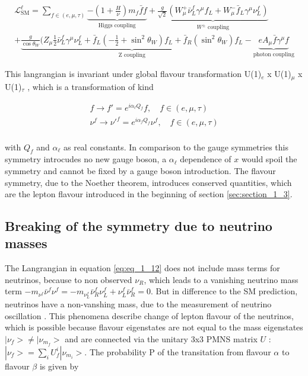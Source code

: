 \begin{multline}
	\label{eq:eq_1_12}
	\mathcal{L}^{\ell}_{\text{SM}} = \sum_{f \in (e, \mu, \tau)} \underbrace{-(1+\frac{H}{\nu}) m_{f} \bar{f}f}_\text{Higgs coupling} + \underbrace{\frac{g}{\sqrt{2}} (W^{+}_{\mu} \bar{\nu}^{f}_{L} \gamma^{\mu} f_{L} + W^{-}_{\mu} \bar{f}_{L} \gamma^{\mu} \nu^{f}_{L})}_{W^{\pm} \text{ coupling}} \\
	+ \underbrace{\frac{g}{\cos{\theta_{W}}}(Z_{\mu} \frac{1}{2} \bar{\nu}^{f}_{L} \gamma^{\mu}\nu^{f}_{L} + \bar{f}_{L}(-\frac{1}{2} + \sin^2{\theta_{W}})f_{L} + \bar{f}_{R}(\sin^2{\theta_{W}})f_{L}}_{\text{Z coupling}} - \underbrace{eA_{\mu}\bar{f}\gamma^{\mu}f}_{\text{photon coupling}}
\end{multline}

This langrangian is invariant under global flavour transformation U(1)$_{e}$ x U(1)$_{\mu}$ x U(1)$_{\tau}$ \cite{LFV1, LFV2}, which is a transformation of kind 

\begin{equation}
	\label{eq:eq_1_13}
	\begin{split}
		f \rightarrow f' = e^{i\alpha_{\ell}Q_{f}}f, \quad f \in (e, \mu, \tau) \\
		\nu^{f} \rightarrow \nu'^{f} = e^{i\alpha_{f}Q_{f}}\nu^{f}, \quad f \in (e, \mu, \tau) \\
	\end{split}
\end{equation}

with $Q_{f}$ and $\alpha_{\ell}$ as real constants. In comparison to the gauge symmetries this symmetry introcudes no new gauge boson, a $\alpha_{\ell}$ dependence of $x$ would spoil the symmetry and cannot be fixed by a gauge boson introduction. The flavour symmetry, due to the Noether theorem, introduces conserved quantities, which are the lepton flavour introduced in the beginning of section \ref{sec:section_1_3}.


\subsection{Breaking of the symmetry due to neutrino masses}
\label{sec:section_1_3_2}

The Langrangian in equation \ref{eq:eq_1_12} does not include mass terms for neutrinos, because to non observed $\nu_R$, which leads to a vanishing neutrino mass term $-m_{\nu^{f}}\bar{\nu}^{f}\nu^{f} = -m_{\nu^{f}_{L}}\bar{\nu}^{f}_{R}\nu^{f}_{L} + {\nu}^{f}_{L}\bar{\nu}^{f}_{R} = 0$. But in difference to the \acs{SM} prediction, neutrinos have a non-vanshing mass, due to the measurement of neutrino oscillation \cite{NEUTRINOOSC}. This phenomena describe change of lepton flavour of the neutrinos, which is possible because flavour eigenstates are not equal to the mass eigenstates $|\nu_{f}> \neq |\nu_{m_{f}}>$ and are connected via the unitary 3x3 PMNS matrix $U$ \cite{PMNS}: $|\nu_{f}> =  \sum_{i} U^{i}_{f}|\nu_{m_{i}}>$. The probability P of the transitation from flavour $\alpha$ to flavour $\beta$ \cite{NEUTRINOPROB} is given by 

